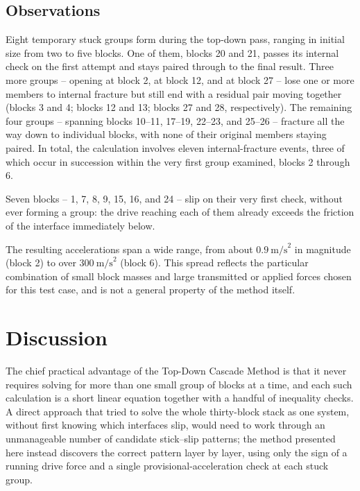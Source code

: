 \documentclass[11pt,a4paper]{article}
\begin{document}
\subsection{Observations}

Eight temporary stuck groups form during the top-down pass, ranging in initial size from two to five blocks. One of them, blocks 20 and 21, passes its internal check on the first attempt and stays paired through to the final result. Three more groups -- opening at block 2, at block 12, and at block 27 -- lose one or more members to internal fracture but still end with a residual pair moving together (blocks 3 and 4; blocks 12 and 13; blocks 27 and 28, respectively). The remaining four groups -- spanning blocks 10--11, 17--19, 22--23, and 25--26 -- fracture all the way down to individual blocks, with none of their original members staying paired. In total, the calculation involves eleven internal-fracture events, three of which occur in succession within the very first group examined, blocks 2 through 6.

Seven blocks -- 1, 7, 8, 9, 15, 16, and 24 -- slip on their very first check, without ever forming a group: the drive reaching each of them already exceeds the friction of the interface immediately below.

The resulting accelerations span a wide range, from about $0.9\ \text{m/s}^2$ in magnitude (block 2) to over $300\ \text{m/s}^2$ (block 6). This spread reflects the particular combination of small block masses and large transmitted or applied forces chosen for this test case, and is not a general property of the method itself.

\section{Discussion}

The chief practical advantage of the Top-Down Cascade Method is that it never requires solving for more than one small group of blocks at a time, and each such calculation is a short linear equation together with a handful of inequality checks. A direct approach that tried to solve the whole thirty-block stack as one system, without first knowing which interfaces slip, would need to work through an unmanageable number of candidate stick--slip patterns; the method presented here instead discovers the correct pattern layer by layer, using only the sign of a running drive force and a single provisional-acceleration check at each stuck group.
\end{document}

